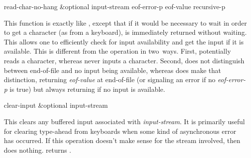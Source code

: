 \begin{defun}[Function]
read-char-no-hang &optional input-stream eof-error-p eof-value recursive-p

This function is exactly like , except
that if it would be necessary to wait in order to get a character (as
from a keyboard), {\false} is immediately returned without waiting.  This
allows one to efficiently check for input availability and get the
input if it is available.
This is different from the  operation in
two~ways.  First,  potentially reads a character,
whereas  never inputs a character.  Second,
 does not distinguish between end-of-file and no input being
available, whereas  does make that distinction, returning
\emph{eof-value} at end-of-file (or signaling an error if no \emph{eof-error-p}
is true) but always returning {\false} if no input
is available.
\end{defun}

\begin{defun}[Function]
clear-input &optional input-stream

This clears any buffered input associated with \emph{input-stream}.
It is primarily useful for clearing type-ahead from keyboards when
some kind of asynchronous error has occurred.  If this operation
doesn't make sense for the stream involved, then 
does nothing.   returns {\false}.
\end{defun}

